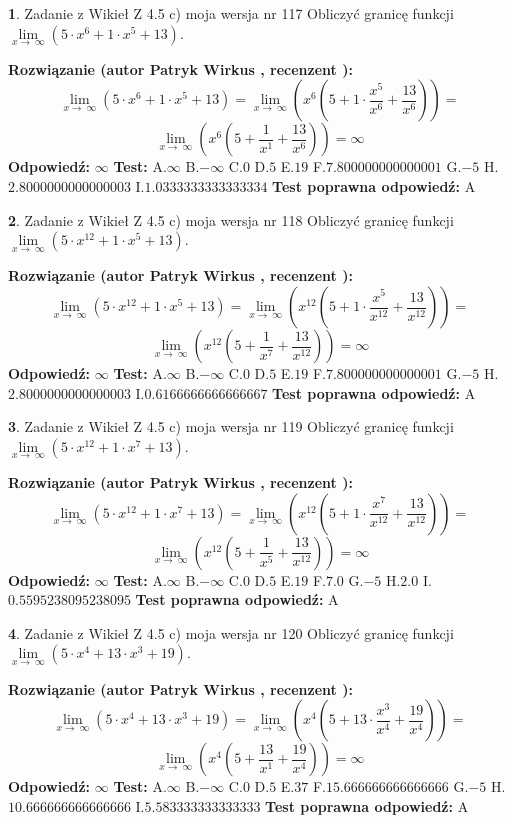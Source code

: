 \documentclass[12pt, a4paper]{article}
\theoremstyle{definition} %
\newtheorem{zad}{}
\newcommand{\zadStart}[1]{\begin{zad}#1\newline}
\newcommand{\zadStop}{\end{zad}}
\newcommand{\rozwStart}[2]{\noindent \textbf{Rozwiązanie (autor #1 , recenzent #2): }\newline}
\newcommand{\rozwStop}{\newline}
\newcommand{\odpStart}{\noindent \textbf{Odpowiedź:}\newline}
\newcommand{\odpStop}{\newline}
\newcommand{\testStart}{\noindent \textbf{Test:}\newline}
\newcommand{\testStop}{\newline}
\newcommand{\kluczStart}{\noindent \textbf{Test poprawna odpowiedź:}\newline}
\newcommand{\kluczStop}{\newline}
\begin{document}
\zadStart{Zadanie z Wikieł Z 4.5 c) moja wersja nr 117}
Obliczyć granicę funkcji  $\lim\limits_{x\to\ \infty}(5 \cdot x^{6}+1 \cdot x^{5}+13)$.
\zadStop
\rozwStart{Patryk Wirkus}{}
$$\lim\limits_{x\to\ \infty}(5 \cdot x^{6}+1 \cdot x^{5}+13) = \lim\limits_{x\to\ \infty}(x^{6}(5 +1 \cdot \frac{x^{5}}{x^{6}}+\frac{13}{x^{6}})) =$$ $$\lim\limits_{x\to\ \infty}(x^{6}(5 +\frac{1}{x^{1}}+\frac{13}{x^{6}})) =\infty$$
\rozwStop
\odpStart
$\infty$
\odpStop
\testStart
A.$\infty$ B.$-\infty$ C.$0$ D.$5$ E.$19$
F.$7.800000000000001$ G.$-5$
H.$2.8000000000000003$
I.$1.0333333333333334$
\testStop
\kluczStart
A
\kluczStop



\zadStart{Zadanie z Wikieł Z 4.5 c) moja wersja nr 118}
Obliczyć granicę funkcji  $\lim\limits_{x\to\ \infty}(5 \cdot x^{12}+1 \cdot x^{5}+13)$.
\zadStop
\rozwStart{Patryk Wirkus}{}
$$\lim\limits_{x\to\ \infty}(5 \cdot x^{12}+1 \cdot x^{5}+13) = \lim\limits_{x\to\ \infty}(x^{12}(5 +1 \cdot \frac{x^{5}}{x^{12}}+\frac{13}{x^{12}})) =$$ $$\lim\limits_{x\to\ \infty}(x^{12}(5 +\frac{1}{x^{7}}+\frac{13}{x^{12}})) =\infty$$
\rozwStop
\odpStart
$\infty$
\odpStop
\testStart
A.$\infty$ B.$-\infty$ C.$0$ D.$5$ E.$19$
F.$7.800000000000001$ G.$-5$
H.$2.8000000000000003$
I.$0.6166666666666667$
\testStop
\kluczStart
A
\kluczStop



\zadStart{Zadanie z Wikieł Z 4.5 c) moja wersja nr 119}
Obliczyć granicę funkcji  $\lim\limits_{x\to\ \infty}(5 \cdot x^{12}+1 \cdot x^{7}+13)$.
\zadStop
\rozwStart{Patryk Wirkus}{}
$$\lim\limits_{x\to\ \infty}(5 \cdot x^{12}+1 \cdot x^{7}+13) = \lim\limits_{x\to\ \infty}(x^{12}(5 +1 \cdot \frac{x^{7}}{x^{12}}+\frac{13}{x^{12}})) =$$ $$\lim\limits_{x\to\ \infty}(x^{12}(5 +\frac{1}{x^{5}}+\frac{13}{x^{12}})) =\infty$$
\rozwStop
\odpStart
$\infty$
\odpStop
\testStart
A.$\infty$ B.$-\infty$ C.$0$ D.$5$ E.$19$
F.$7.0$ G.$-5$
H.$2.0$
I.$0.5595238095238095$
\testStop
\kluczStart
A
\kluczStop



\zadStart{Zadanie z Wikieł Z 4.5 c) moja wersja nr 120}
Obliczyć granicę funkcji  $\lim\limits_{x\to\ \infty}(5 \cdot x^{4}+13 \cdot x^{3}+19)$.
\zadStop
\rozwStart{Patryk Wirkus}{}
$$\lim\limits_{x\to\ \infty}(5 \cdot x^{4}+13 \cdot x^{3}+19) = \lim\limits_{x\to\ \infty}(x^{4}(5 +13 \cdot \frac{x^{3}}{x^{4}}+\frac{19}{x^{4}})) =$$ $$\lim\limits_{x\to\ \infty}(x^{4}(5 +\frac{13}{x^{1}}+\frac{19}{x^{4}})) =\infty$$
\rozwStop
\odpStart
$\infty$
\odpStop
\testStart
A.$\infty$ B.$-\infty$ C.$0$ D.$5$ E.$37$
F.$15.666666666666666$ G.$-5$
H.$10.666666666666666$
I.$5.583333333333333$
\testStop
\kluczStart
A
\kluczStop
\end{document}
